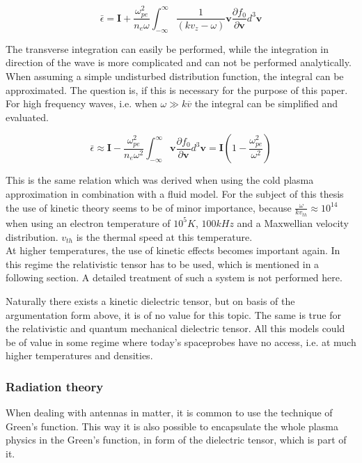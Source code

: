 \documentclass[a4paper,11pt]{article}
\begin{document}
\begin{equation}
\bar{\epsilon} =\mathbf{I} +  \frac{\omega_{pe}^2}{n_e  \omega}  \int_{-\infty}^{\infty} \frac{1}{ (k  v_z-\omega)}\mathbf{v} \frac{\partial f_0}{\partial \mathbf{v}} d^3 \mathbf{v}
\end{equation}

The transverse integration can easily be performed, while the integration in direction of the wave is more complicated and can not be performed analytically. When assuming a simple undisturbed distribution function, the integral can be approximated. The question is, if this is necessary for the purpose of this paper. \\

For high frequency waves, i.e. when $\omega \gg k\overline{v}$ the integral can be simplified and evaluated.

\begin{equation}
\bar{\epsilon} \approx \mathbf{I} -  \frac{\omega_{pe}^2}{n_e  \omega^2}  \int_{-\infty}^{\infty} \mathbf{v} \frac{\partial f_0}{\partial \mathbf{v}} d^3 \mathbf{v}=\mathbf{I}\left( 1 -  \frac{\omega_{pe}^2}{  \omega^2}\right)
\end{equation}

This is the same relation which was derived when using the cold plasma approximation in combination with a fluid model. For the subject of this thesis the use of kinetic theory seems to be of minor importance, because $\frac{\omega}{kv_{th}}\approx 10^{14}$ when using an electron temperature of $10^5K$, $100kHz$ and a Maxwellian velocity distribution. $v_{th}$ is the thermal speed at this temperature. \\

At higher temperatures, the use of kinetic effects becomes important again. In this regime the relativistic tensor has to be used, which is mentioned in a following section. A detailed treatment of such a system is not performed here.

Naturally there exists a kinetic dielectric tensor, but on basis of the argumentation form above, it is of no value for this topic. The same is true for the relativistic and quantum mechanical dielectric tensor. All this models could be of value in some regime where today's spaceprobes have no access, i.e. at much higher temperatures and densities. 

\subsubsection{Radiation theory}
When dealing with antennas in matter, it is common to use the technique of Green's function. This way it is also possible to encapsulate the whole plasma physics in the Green's function, in form of the dielectric tensor, which is part of it.\\
\end{document}

